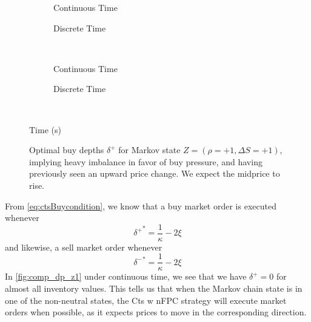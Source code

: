 \begin{figure}
\centering
\begin{subfigure}{.45\linewidth}
  \centering
  \setlength\figureheight{\linewidth} 
  \setlength\figurewidth{\linewidth}
  
  \caption{Continuous Time}
\end{subfigure}%
\hfill%
\begin{subfigure}{.45\linewidth}
  \centering
  \setlength\figureheight{\linewidth} 
  \setlength\figurewidth{\linewidth}
   
  \caption{Discrete Time}
\end{subfigure}\\
\vspace{1cm}
\begin{subfigure}{.45\linewidth}
  \centering
  \setlength\figureheight{\linewidth} 
  \setlength\figurewidth{\linewidth}
  
  \caption{Continuous Time}
\end{subfigure}%
\hfill%
\begin{subfigure}{.45\linewidth}
  \centering
  \setlength\figureheight{\linewidth} 
  \setlength\figurewidth{\linewidth}
   
  \caption{Discrete Time}
\end{subfigure}\\

\leavevmode{}\hspace{0pt plus 1filll}\null

Time (s)

\vspace{1cm}
\begin{subfigure}{\linewidth}
  \centering
   
\end{subfigure}%
  \caption{Optimal buy depths $\delta^{+}$ for Markov state $Z=(\rho = +1, \Delta S = +1)$, implying heavy imbalance in favor of buy pressure, and having previously seen an upward price change. We expect the midprice to rise.}
  \label{fig:comp_dp_z15_test}
\end{figure}

From \eqref{eq:ctsBuycondition}, we know that a buy market order is executed whenever
\begin{equation}
{\delta^+}^* =  \frac{1}{\kappa} - 2 \xi
\end{equation}
and likewise, a sell market order whenever
\begin{equation}
{\delta^-}^* =  \frac{1}{\kappa} - 2 \xi
\end{equation}
In \autoref{fig:comp_dp_z1} under continuous time, we see that we have $\delta^+ = 0$ for almost all inventory values. This tells us that when the Markov chain state is in one of the non-neutral states, the Cts w nFPC strategy will execute market orders when possible, as it expects prices to move in the corresponding direction.

